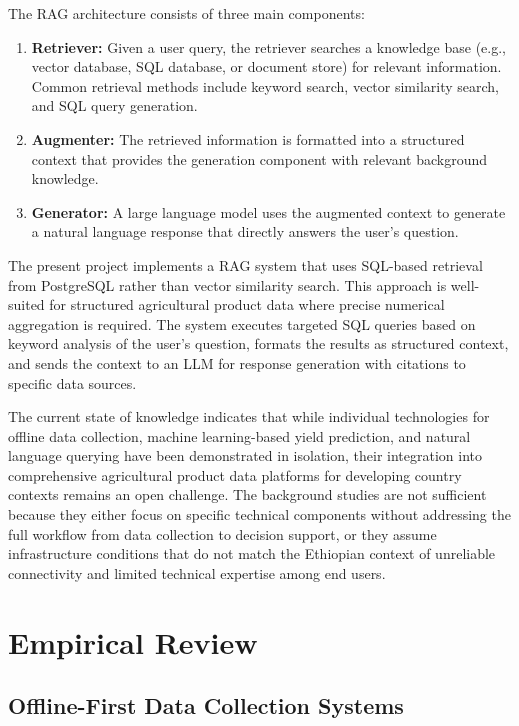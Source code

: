 The RAG architecture consists of three main components:
\begin{enumerate}
  \item \textbf{Retriever:} Given a user query, the retriever searches a knowledge base (e.g., vector database, SQL database, or document store) for relevant information. Common retrieval methods include keyword search, vector similarity search, and SQL query generation.
  \item \textbf{Augmenter:} The retrieved information is formatted into a structured context that provides the generation component with relevant background knowledge.
  \item \textbf{Generator:} A large language model uses the augmented context to generate a natural language response that directly answers the user's question.
\end{enumerate}

The present project implements a RAG system that uses SQL-based retrieval from PostgreSQL rather than vector similarity search. This approach is well-suited for structured agricultural product data where precise numerical aggregation is required. The system executes targeted SQL queries based on keyword analysis of the user's question, formats the results as structured context, and sends the context to an LLM for response generation with citations to specific data sources.

The current state of knowledge indicates that while individual technologies for offline data collection, machine learning-based yield prediction, and natural language querying have been demonstrated in isolation, their integration into comprehensive agricultural product data platforms for developing country contexts remains an open challenge. The background studies are not sufficient because they either focus on specific technical components without addressing the full workflow from data collection to decision support, or they assume infrastructure conditions that do not match the Ethiopian context of unreliable connectivity and limited technical expertise among end users.

\section{Empirical Review}

\subsection{Offline-First Data Collection Systems}

